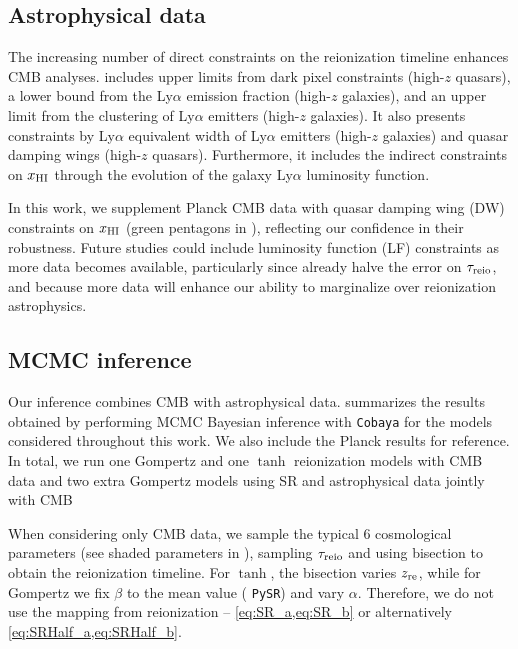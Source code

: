 \subsection*{Astrophysical data}
\label{ssec:xHI}

The increasing number of direct constraints on the reionization timeline
enhances CMB analyses.
 includes upper limits from dark pixel
constraints\cite{Jin2023} (high-$z$ quasars), a lower bound from the
Ly$\alpha$ emission fraction\cite{Mesinger2015} (high-$z$ galaxies), and
an upper limit from the clustering of Ly$\alpha$
emitters\cite{Sobacchi2015} (high-$z$ galaxies).
It also presents constraints by Ly$\alpha$ equivalent width of
Ly$\alpha$ emitters\cite{Mason2018, Mason2019, Hoag2019} (high-$z$
galaxies) and quasar damping wings\cite{Greig2022, Greig2024, Spina2024,
Durovcikova2024} (high-$z$ quasars).
Furthermore, it includes the indirect constraints on $x_{\mathrm{HI}}$ through the
evolution of the galaxy Ly$\alpha$ luminosity
function\cite{Morales2021}.

In this work, we supplement Planck CMB data with quasar damping wing
(DW) constraints on $x_{\mathrm{HI}}$ (green pentagons in ),
reflecting our confidence in their robustness.
Future studies could include luminosity function (LF) constraints as
more data becomes available, particularly since  already halve the error on $\tau_{\mathrm{reio}}$, and because more data
will enhance our ability to  marginalize over reionization
astrophysics.


\subsection*{MCMC inference}
\label{ssec:fits}

Our inference combines CMB with astrophysical data.
 summarizes the results obtained by performing MCMC
Bayesian inference with \texttt{Cobaya} for the models considered
throughout this work.
We also include the Planck results \cite{Planck2020a} for reference.
In total, we run one Gompertz and one $\tanh$ reionization models with
CMB data and two extra Gompertz models using SR and astrophysical data
jointly with CMB 

When considering only CMB data, we sample the typical 6 cosmological
parameters (see shaded parameters in ), sampling
$\tau_{\mathrm{reio}}$ and using bisection to obtain the reionization timeline.
For $\tanh$, the bisection varies $z_{\mathrm{re}}$, while for Gompertz we fix
$\beta$ to the mean value (
\texttt{PySR}) and vary $\alpha$.
Therefore, we do not use the  mapping from 
reionization -- \cref{eq:SR_a,eq:SR_b} or alternatively
\cref{eq:SRHalf_a,eq:SRHalf_b}.

